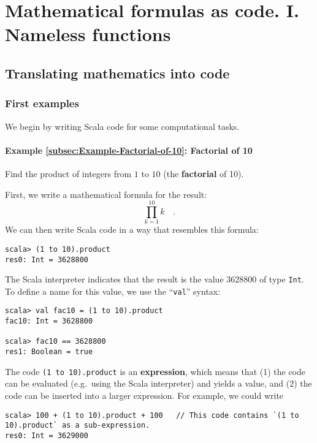 
\chapter{Mathematical formulas as code. I. Nameless functions\label{chap:1-Values,-types,-expressions,}}

\section{Translating mathematics into code}

\subsection{First examples}

We begin by writing Scala code for some computational tasks.

\subsubsection{Example \label{subsec:Example-Factorial-of-10}\ref{subsec:Example-Factorial-of-10}:
Factorial of 10}

Find the product of integers from $1$ to $10$ (the \textbf{factorial}
of 10).

First, we write a mathematical formula for the result:
\[
\prod_{k=1}^{10}k\quad.
\]
We can then write Scala code in a way that resembles this formula:
\begin{lstlisting}
scala> (1 to 10).product
res0: Int = 3628800
\end{lstlisting}

The Scala interpreter indicates that the result is the value $3628800$
of type \lstinline!Int!. To define a name for this value, we use
the \textsf{``}\lstinline!val!\textsf{''} syntax:
\begin{lstlisting}
scala> val fac10 = (1 to 10).product
fac10: Int = 3628800

scala> fac10 == 3628800
res1: Boolean = true
\end{lstlisting}

The code \texttt{}\lstinline!(1 to 10).product! is an \textbf{expression},
which means that (1) the code can be evaluated (e.g.~using the Scala
interpreter) and yields a value, and (2) the code can be inserted
into a larger expression. For example, we could write
\begin{lstlisting}
scala> 100 + (1 to 10).product + 100   // This code contains `(1 to 10).product` as a sub-expression.
res0: Int = 3629000
\end{lstlisting}


